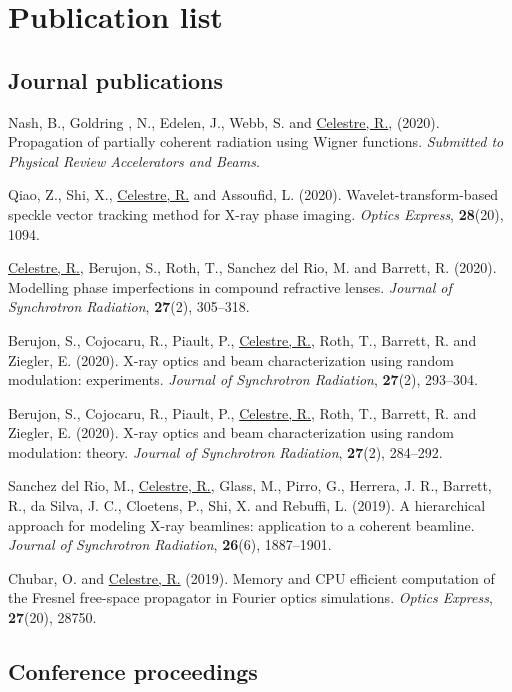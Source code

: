 \appendix

\chapter{Publication list}\label{sec:publications}

\section*{Journal publications}

Nash, B., Goldring , N., Edelen, J., Webb, S. and \underline{Celestre, R.}, (2020). Propagation of partially coherent radiation using Wigner functions. \textit{Submitted to Physical Review Accelerators and Beams}. 

Qiao, Z., Shi, X., \underline{Celestre, R.} and Assoufid, L. (2020). Wavelet-transform-based speckle vector tracking method for X-ray phase imaging. \textit{Optics Express}, \textbf{28}(20), 1094. 

\underline{Celestre, R.}, Berujon, S., Roth, T., Sanchez del Rio, M. and Barrett, R. (2020). Modelling phase imperfections in compound refractive lenses. \textit{Journal of Synchrotron Radiation}, \textbf{27}(2), 305–318. 

Berujon, S., Cojocaru, R., Piault, P., \underline{Celestre, R.}, Roth, T., Barrett, R. and Ziegler, E. (2020). X-ray optics and beam characterization using random modulation: experiments. \textit{Journal of Synchrotron Radiation}, \textbf{27}(2), 293–304.

Berujon, S., Cojocaru, R., Piault, P., \underline{Celestre, R.}, Roth, T., Barrett, R. and Ziegler, E. (2020). X-ray optics and beam characterization using random modulation: theory. \textit{Journal of Synchrotron Radiation}, \textbf{27}(2), 284–292.

Sanchez del Rio, M., \underline{Celestre, R.}, Glass, M., Pirro, G., Herrera, J. R., Barrett, R., da Silva, J. C., Cloetens, P., Shi, X. and Rebuffi, L. (2019). A hierarchical approach for modeling X-ray beamlines: application to a coherent beamline. \textit{Journal of Synchrotron Radiation}, \textbf{26}(6), 1887–1901.

Chubar, O. and \underline{Celestre, R.} (2019). Memory and CPU efficient computation of the Fresnel free-space propagator in Fourier optics simulations. \textit{Optics Express}, \textbf{27}(20), 28750. 

\section*{Conference proceedings}

